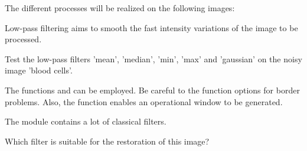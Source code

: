 The different processes will be realized on the following images:
{
	\makeatletter
	\renewcommand\fs@ruled{\def\@fs@cfont{\bfseries}\let\@fs@capt\floatc@ruled
		\def\@fs@pre{\hrule height.8pt depth0pt \kern2pt}%
		\def\@fs@post{\kern2pt\hrule\relax}%
		\def\@fs@mid{\vskip2pt}%
		\let\@fs@iftopcapt\iftrue}
	\makeatother
\begin{figure}[H]
\centering
{}
\hfill
{}
\vspace*{-10pt}
\end{figure}
}

Low-pass filtering aims to smooth the fast intensity variations of the image to be processed.
\begin{qbox}
Test the low-pass filters 'mean', 'median', 'min', 'max' and 'gaussian' on the noisy image 'blood cells'. 
\end{qbox}

	\begin{mcomment}
\begin{mremark}The \matlabregistered{} functions  and  can be employed.
Be careful to the function options for border problems. Also, the \matlabregistered{} function  enables an operational window to be generated.
\end{mremark}
\end{mcomment}

\begin{pcomment}
\begin{premark}
The module  contains a lot of classical filters.
\end{premark}
\end{pcomment}
\begin{qbox}
Which filter is suitable for the restoration of this image?
\end{qbox}

